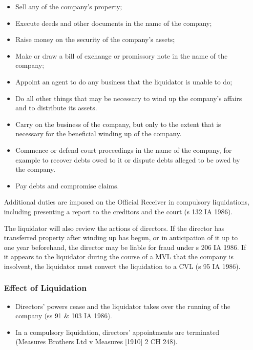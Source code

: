 \documentclass[
]{article}
\providecommand{\tightlist}{%
  \setlength{\itemsep}{0pt}\setlength{\parskip}{0pt}}
\begin{document}
\begin{itemize}
\tightlist
\item
  Sell any of the company's property;
\item
  Execute deeds and other documents in the name of the company;
\item
  Raise money on the security of the company's assets;
\item
  Make or draw a bill of exchange or promissory note in the name of the
  company;
\item
  Appoint an agent to do any business that the liquidator is unable to
  do;
\item
  Do all other things that may be necessary to wind up the company's
  affairs and to distribute its assets.
\item
  Carry on the business of the company, but only to the extent that is
  necessary for the beneficial winding up of the company.
\item
  Commence or defend court proceedings in the name of the company, for
  example to recover debts owed to it or dispute debts alleged to be
  owed by the company.
\item
  Pay debts and compromise claims.
\end{itemize}

Additional duties are imposed on the Official Receiver in compulsory
liquidations, including presenting a report to the creditors and the
court (s 132 IA 1986).

The liquidator will also review the actions of directors. If the
director has transferred property after winding up has begun, or in
anticipation of it up to one year beforehand, the director may be liable
for fraud under s 206 IA 1986. If it appears to the liquidator during
the course of a MVL that the company is insolvent, the liquidator must
convert the liquidation to a CVL (s 95 IA 1986).

\hypertarget{effect-of-liquidation}{%
\subsubsection{Effect of Liquidation}\label{effect-of-liquidation}}

\begin{itemize}
\tightlist
\item
  Directors' powers cease and the liquidator takes over the running of
  the company (ss 91 \& 103 IA 1986).
\item
  In a compulsory liquidation, directors' appointments are terminated
  (Measures Brothers Ltd v Measures {[}1910{]} 2 CH 248).
\end{itemize}
\end{document}
